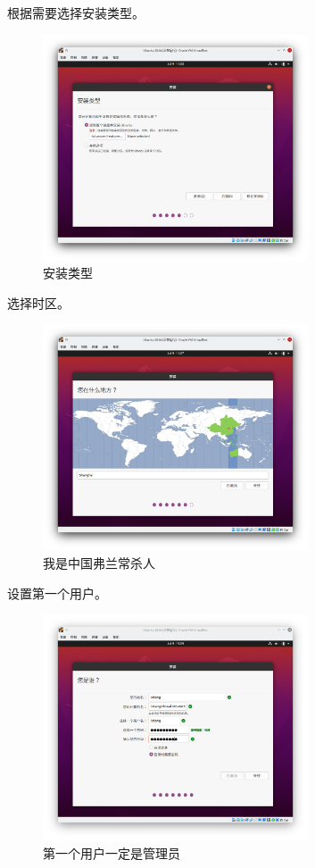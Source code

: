 \documentclass[UTF-8]{ctexart}
\begin{document}
				根据需要选择安装类型。
			
				\begin{figure}[H]
					\centering
					\includegraphics[width=0.7\textwidth]{fig/ubuntu_install_5.png}
					\caption*{安装类型}
				\end{figure}
			
				选择时区。
			
				\begin{figure}[H]
					\centering
					\includegraphics[width=0.7\textwidth]{fig/ubuntu_install_6.png}
					\caption*{我是中国弗兰常杀人}
				\end{figure}
			
				设置第一个用户。
				
				\begin{figure}[H]
					\centering
					\includegraphics[width=0.7\textwidth]{fig/ubuntu_install_7.png}
					\caption*{第一个用户一定是管理员}
				\end{figure}
			
\end{document}
